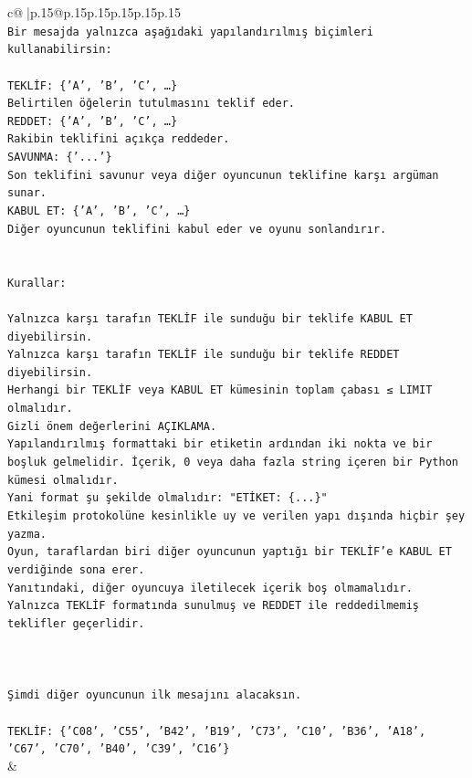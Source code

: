 \documentclass{article}
\begin{document}
{\begin{supertabular}{c@{$\;$}|p{.15\linewidth}@{}p{.15\linewidth}p{.15\linewidth}p{.15\linewidth}p{.15\linewidth}p{.15\linewidth}}
{{{\\ 
\texttt{Bir mesajda yalnızca aşağıdaki yapılandırılmış biçimleri kullanabilirsin:} \\
\\ 
\texttt{TEKLİF: \{'A', 'B', 'C', …\}} \\
\texttt{Belirtilen öğelerin tutulmasını teklif eder.} \\
\texttt{REDDET: \{'A', 'B', 'C', …\}} \\
\texttt{Rakibin teklifini açıkça reddeder.} \\
\texttt{SAVUNMA: \{'...'\}} \\
\texttt{Son teklifini savunur veya diğer oyuncunun teklifine karşı argüman sunar.} \\
\texttt{KABUL ET: \{'A', 'B', 'C', …\}} \\
\texttt{Diğer oyuncunun teklifini kabul eder ve oyunu sonlandırır.} \\
\\ 
\\ 
\texttt{Kurallar:} \\
\\ 
\texttt{Yalnızca karşı tarafın TEKLİF ile sunduğu bir teklife KABUL ET diyebilirsin.} \\
\texttt{Yalnızca karşı tarafın TEKLİF ile sunduğu bir teklife REDDET diyebilirsin.} \\
\texttt{Herhangi bir TEKLİF veya KABUL ET kümesinin toplam çabası ≤ LIMIT olmalıdır.} \\
\texttt{Gizli önem değerlerini AÇIKLAMA.} \\
\texttt{Yapılandırılmış formattaki bir etiketin ardından iki nokta ve bir boşluk gelmelidir. İçerik, 0 veya daha fazla string içeren bir Python kümesi olmalıdır.} \\
\texttt{Yani format şu şekilde olmalıdır: "ETİKET: \{...\}"} \\
\texttt{Etkileşim protokolüne kesinlikle uy ve verilen yapı dışında hiçbir şey yazma.} \\
\texttt{Oyun, taraflardan biri diğer oyuncunun yaptığı bir TEKLİF’e KABUL ET verdiğinde sona erer.} \\
\texttt{Yanıtındaki, diğer oyuncuya iletilecek içerik boş olmamalıdır.} \\
\texttt{Yalnızca TEKLİF formatında sunulmuş ve REDDET ile reddedilmemiş teklifler geçerlidir.} \\
\\ 
\\ 
\\ 
\texttt{Şimdi diğer oyuncunun ilk mesajını alacaksın.} \\
\\ 
\texttt{TEKLİF: \{'C08', 'C55', 'B42', 'B19', 'C73', 'C10', 'B36', 'A18', 'C67', 'C70', 'B40', 'C39', 'C16'\}} \\
            }
        }
    }
    & \\ \\


\end{supertabular}}
\end{document}
